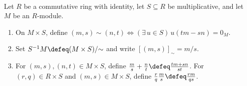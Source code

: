 \begin{definition} \label{def:module-localization} \\
Let $R$ be a commutative ring with identity, let $S\subseteq R$ be multiplicative, and let $M$ be an $R$-module.
\begin{enumerate}[label=(\roman*)]
\setlength{\itemsep}{0pt}
\item On $M\times S$, define $(m,s)\sim(n,t)\Longleftrightarrow(\exists\,u\in S)\,u(tm-sn)=0_M$.
\item Set $S^{-1}M\defeq(M\times S)/{\sim}$ and write $[(m,s)]_{\sim}=m/s$.
\item For $(m,s),(n,t)\in M\times S$, define $\frac{m}{s}+\frac{n}{t}\defeq\frac{tm+sn}{st}$. For $(r,q)\in R\times S$ and $(m,s)\in M\times S$, define $\frac{r}{q}\frac{m}{s}\defeq\frac{rm}{qs}$.
\end{enumerate}
\end{definition}

